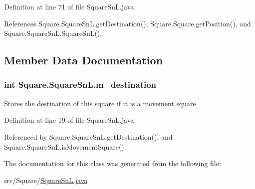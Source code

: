 Definition at line 71 of file Square\+Sn\+L.\+java.



References Square.\+Square\+Sn\+L.\+get\+Destination(), Square.\+Square.\+get\+Position(), and Square.\+Square\+Sn\+L.\+Square\+Sn\+L().



\subsection{Member Data Documentation}
\hypertarget{class_square_1_1_square_sn_l_a1906be8d7e5ea28a4b5b1585d820186f}{}
\subsubsection[{m\+\_\+destination}]{\setlength{\rightskip}{0pt plus 5cm}int Square.\+Square\+Sn\+L.\+m\+\_\+destination\hspace{0.3cm}{\ttfamily [private]}}\label{class_square_1_1_square_sn_l_a1906be8d7e5ea28a4b5b1585d820186f}
Stores the destination of this square if it is a movement square 

Definition at line 19 of file Square\+Sn\+L.\+java.



Referenced by Square.\+Square\+Sn\+L.\+get\+Destination(), and Square.\+Square\+Sn\+L.\+is\+Movement\+Square().



The documentation for this class was generated from the following file\+:\begin{DoxyCompactItemize}
\item 
src/\+Square/\hyperlink{_square_sn_l_8java}{Square\+Sn\+L.\+java}\end{DoxyCompactItemize}
